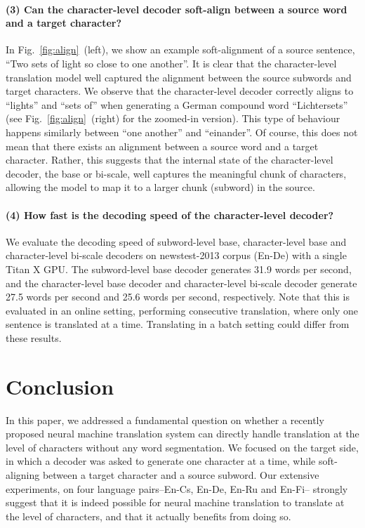 \documentclass[11pt]{article}
\begin{document}
\paragraph{(3) Can the character-level decoder soft-align between a source
word and a target character?}
In Fig.~\ref{fig:align}~(left), we show an example soft-alignment of a source
sentence, ``Two sets of light so close to one another''. It is clear that the
character-level translation model well captured the alignment between the source
subwords and target characters. We observe that the character-level decoder
correctly aligns to ``lights'' and ``sets of'' when generating a German compound
word ``Lichtersets'' (see Fig.~\ref{fig:align}~(right) for the zoomed-in version).
This type of behaviour happens similarly between ``one another'' and
``einander''. Of course, this does not mean that there exists an alignment
between a source word and a target character.  Rather, this suggests that the
internal state of the character-level decoder, the base or bi-scale, well
captures the meaningful chunk of characters, allowing the model to map it to a larger chunk
(subword) in the source.

\paragraph{(4) How fast is the decoding speed of the character-level decoder?}
We evaluate the decoding speed of subword-level base, character-level base and 
character-level bi-scale decoders on newstest-2013 corpus (En-De) with a single Titan X GPU.
The subword-level base decoder generates 31.9 words per second, and the character-level base decoder
and character-level bi-scale decoder generate 27.5 words per second and 25.6 words per second, respectively.
Note that this is evaluated in an online setting, performing consecutive translation, where only one sentence is translated
at a time. Translating in a batch setting could differ from these results.

\section{Conclusion}
\label{sec:conclusion}

In this paper, we addressed a fundamental question on whether a recently
proposed neural machine translation system can directly handle translation at
the level of characters without any word segmentation. We focused on the target
side, in which a decoder was asked to generate one character at a time, while
soft-aligning between a target character and a source subword.
Our extensive experiments,
on four language pairs--En-Cs, En-De, En-Ru and En-Fi-- strongly
suggest that it is indeed possible for neural machine translation to translate
at the level of characters, and that it actually benefits from doing so.
\end{document}
